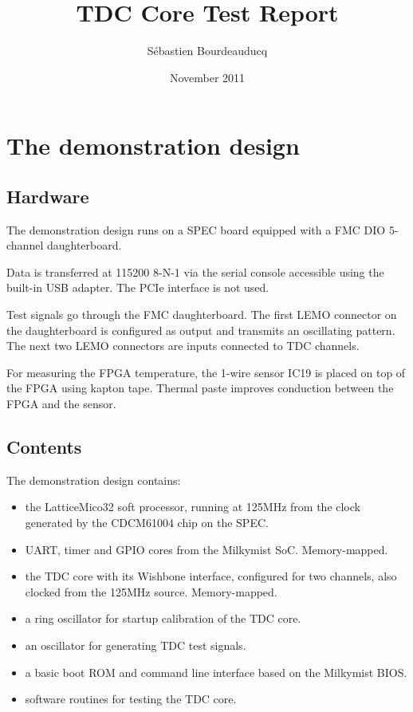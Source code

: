 \documentclass[a4paper,11pt]{article}
\title{TDC Core Test Report}
\author{S\'ebastien Bourdeauducq}
\date{November 2011}
\begin{document}
\setlength{\parindent}{0pt}
\setlength{\parskip}{5pt}
\maketitle{}
\section{The demonstration design}
\subsection{Hardware}
The demonstration design runs on a SPEC board equipped with a FMC DIO 5-channel daughterboard.

Data is transferred at 115200 8-N-1 via the serial console accessible using the built-in USB adapter. The PCIe interface is not used.

Test signals go through the FMC daughterboard. The first LEMO connector on the daughterboard is configured as output and transmits an oscillating pattern. The next two LEMO connectors are inputs connected to TDC channels.

For measuring the FPGA temperature, the 1-wire sensor IC19 is placed on top of the FPGA using kapton tape. Thermal paste improves conduction between the FPGA and the sensor.

\subsection{Contents}
The demonstration design contains:
\begin{itemize}
\item the LatticeMico32 soft processor, running at 125MHz from the clock generated by the CDCM61004 chip on the SPEC.
\item UART, timer and GPIO cores from the Milkymist SoC. Memory-mapped.
\item the TDC core with its Wishbone interface, configured for two channels, also clocked from the 125MHz source. Memory-mapped.
\item a ring oscillator for startup calibration of the TDC core.
\item an oscillator for generating TDC test signals.
\item a basic boot ROM and command line interface based on the Milkymist BIOS.
\item software routines for testing the TDC core.
\end{itemize}
\end{document}
